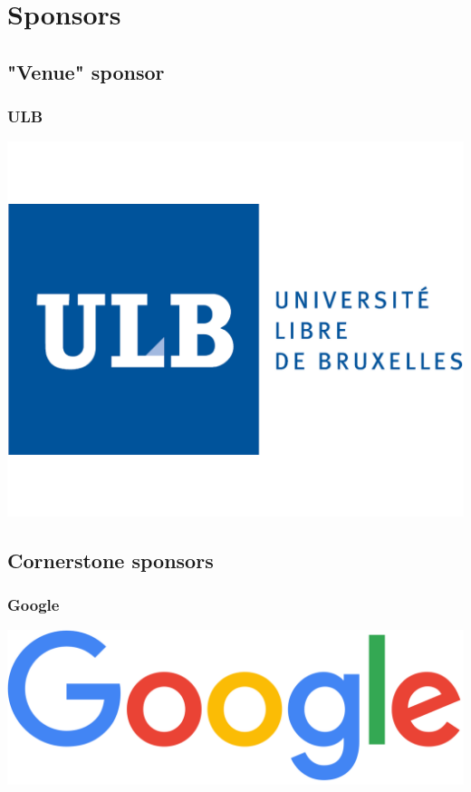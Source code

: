\documentclass[aspectratio=169]{beamer}
\begin{document}
\section{Sponsors}


\subsection{"Venue" sponsor}


\begin{frame}
	\frametitle{ULB}
		\includegraphics[scale=1.5]{images/logo_ulb.png}
\end{frame}


\subsection{Cornerstone sponsors}


\begin{frame}
	\frametitle{Google}
	\vfill
		\includegraphics[scale=0.25]{images/google.png}
	\vfill
\end{frame}
\end{document}
